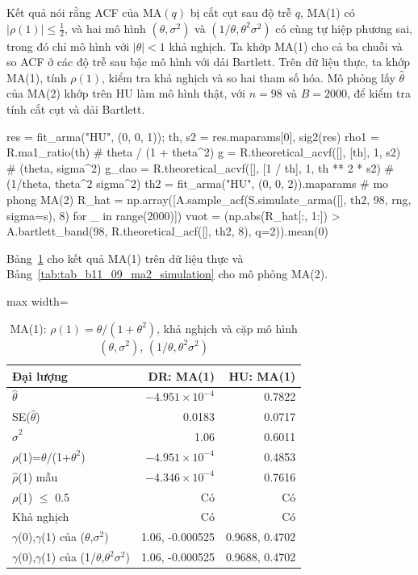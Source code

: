  Kết quả  nói rằng ACF của MA$(q)$ bị cắt cụt sau độ trễ $q$, MA(1) có $|\rho(1)|\le\tfrac12$, và hai mô hình $(\theta,\sigma^2)$ và $(1/\theta,\theta^2\sigma^2)$ có cùng tự hiệp phương sai, trong đó chỉ mô hình với $|\theta|<1$ khả nghịch.
 Ta khớp MA(1) cho cả ba chuỗi và so ACF ở các độ trễ sau bậc mô hình với dải Bartlett. Trên dữ liệu thực, ta khớp MA(1), tính $\rho(1)$, kiểm tra khả nghịch và so hai tham số hóa. Mô phỏng lấy $\hat\theta$ của MA(2) khớp trên HU làm mô hình thật, với $n=98$ và $B=2000$, để kiểm tra tính cắt cụt và dải Bartlett.
\begin{codeblock}
res = fit_arma("HU", (0, 0, 1)); th, s2 = res.maparams[0], sig2(res)
rho1 = R.ma1_ratio(th)                                   # theta / (1 + theta^2)
g = R.theoretical_acvf([], [th], 1, s2)                   # (theta, sigma^2)
g_dao = R.theoretical_acvf([], [1 / th], 1, th ** 2 * s2) # (1/theta, theta^2 sigma^2)
th2 = fit_arma("HU", (0, 0, 2)).maparams                  # mo phong MA(2)
R_hat = np.array([A.sample_acf(S.simulate_arma([], th2, 98, rng, sigma=s), 8) for _ in range(2000)])
vuot = (np.abs(R_hat[:, 1:]) > A.bartlett_band(98, R.theoretical_acf([], th2, 8), q=2)).mean(0)
\end{codeblock}
 Bảng~\ref{tab:tab_b11_09_ma1} cho kết quả MA(1) trên dữ liệu thực và Bảng~\ref{tab:tab_b11_09_ma2_simulation} cho mô phỏng MA(2).
\begin{table}[H]
\centering\footnotesize
\caption{MA(1): $\rho(1)=\theta/(1+\theta^2)$, khả nghịch và cặp mô hình $(\theta,\sigma^2)$, $(1/\theta,\theta^2\sigma^2)$}\label{tab:tab_b11_09_ma1}
\begin{adjustbox}{max width=\linewidth}
\begin{tabular}{|l|r|r|}
\toprule
Đại lượng & DR: MA(1) & HU: MA(1) \\
\midrule
$\hat{\theta}$ & $-4.951\times10^{-4}$ & 0.7822 \\
SE($\hat{\theta}$) & 0.0183 & 0.0717 \\
$\hat{\sigma}^{2}$ & 1.06 & 0.6011 \\
$\rho$(1)=$\theta$/(1+$\theta^{2}$) & $-4.951\times10^{-4}$ & 0.4853 \\
$\hat{\rho}$(1) mẫu & $-4.346\times10^{-4}$ & 0.7616 \\
\textbar{}$\rho$(1)\textbar{} $\le$ 0.5 & Có & Có \\
Khả nghịch & Có & Có \\
$\gamma$(0),$\gamma$(1) của ($\theta$,$\sigma^{2}$) & 1.06, -0.000525 & 0.9688, 0.4702 \\
$\gamma$(0),$\gamma$(1) của (1/$\theta$,$\theta^{2}\sigma^{2}$) & 1.06, -0.000525 & 0.9688, 0.4702 \\
\bottomrule
\end{tabular}
\end{adjustbox}
\end{table}
